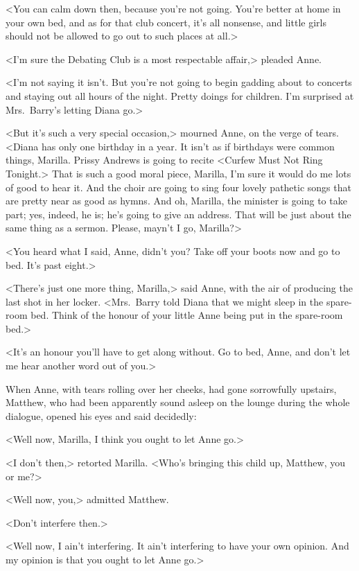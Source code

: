 <You can calm down then, because you're not going. You're better at home in your own bed, and as for that club concert, it's all nonsense, and little girls should not be allowed to go out to such places at all.>

<I'm sure the Debating Club is a most respectable affair,> pleaded Anne.

<I'm not saying it isn't. But you're not going to begin gadding about to concerts and staying out all hours of the night. Pretty doings for children. I'm surprised at Mrs.~Barry's letting Diana go.>

<But it's such a very special occasion,> mourned Anne, on the verge of tears. <Diana has only one birthday in a year. It isn't as if birthdays were common things, Marilla. Prissy Andrews is going to recite <Curfew Must Not Ring Tonight.> That is such a good moral piece, Marilla, I'm sure it would do me lots of good to hear it. And the choir are going to sing four lovely pathetic songs that are pretty near as good as hymns. And oh, Marilla, the minister is going to take part; yes, indeed, he is; he's going to give an address. That will be just about the same thing as a sermon. Please, mayn't I go, Marilla?>

<You heard what I said, Anne, didn't you? Take off your boots now and go to bed. It's past eight.>

<There's just one more thing, Marilla,> said Anne, with the air of producing the last shot in her locker. <Mrs.~Barry told Diana that we might sleep in the spare-room bed. Think of the honour of your little Anne being put in the spare-room bed.>

<It's an honour you'll have to get along without. Go to bed, Anne, and don't let me hear another word out of you.>

When Anne, with tears rolling over her cheeks, had gone sorrowfully upstairs, Matthew, who had been apparently sound asleep on the lounge during the whole dialogue, opened his eyes and said decidedly:

<Well now, Marilla, I think you ought to let Anne go.>

<I don't then,> retorted Marilla. <Who's bringing this child up, Matthew, you or me?>

<Well now, you,> admitted Matthew.

<Don't interfere then.>

<Well now, I ain't interfering. It ain't interfering to have your own opinion. And my opinion is that you ought to let Anne go.>

